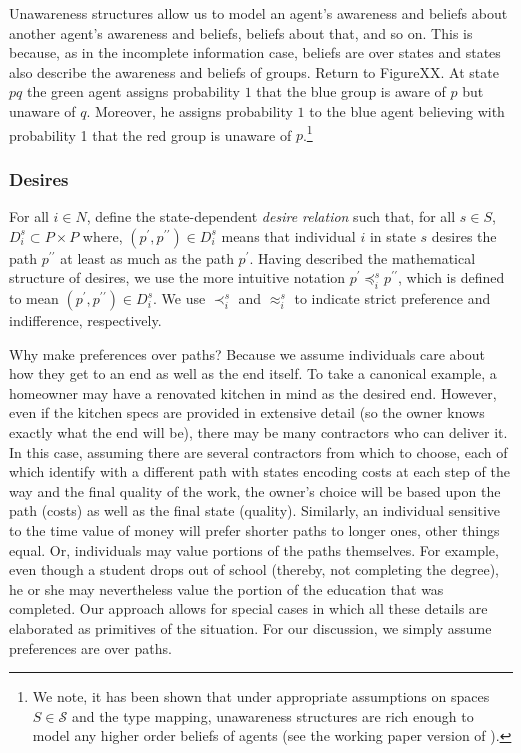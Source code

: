 \documentclass[
11pt,
titlepage,
reqno,
]{article}%
\theoremstyle{definition}
\begin{document}
Unawareness structures allow us to model an agent's awareness and beliefs about another agent's awareness and beliefs, beliefs about that, and so on. This is because, as in the incomplete information case,  beliefs are over states and states also describe the awareness and beliefs of groups.  Return to FigureXX. At state $pq$ the green agent assigns probability $1$ that the blue group is aware of $p$ but unaware of $q$. Moreover, he assigns probability $1$ to the blue agent believing with probability 1 that the red group is unaware of $p$.\footnote{We  note, it has been shown that under appropriate assumptions on spaces $S \in \mathcal{S}$ and the type mapping, unawareness structures are rich enough to model any higher order beliefs of agents (see the working paper version of \citet{Heifetz2013}).}
	
\subsubsection{Desires \label{para: desires}}
	For all $i\in N$, define the state-dependent \textit{desire relation} such that, for all $s\in S$,   $D_i^s\subset P\times P$ where, $(p^\prime,p^{\prime\prime})\in D_i^s$ means that  individual $i$ in state $s$ desires the path $p^{\prime\prime}$ at least as much as the path $p^\prime$. 
	Having described the mathematical structure of desires, we use the more intuitive notation $p^\prime\preceq_i^s p^{\prime\prime}$, which is defined to mean $(p^\prime,p^{\prime\prime})\in D_i^s$. 
	We use $\prec_i^s$ and $\approx_i^s$ to indicate strict preference and indifference, respectively. 
	
	Why make preferences over paths? Because we assume individuals care about how they get to an end as well as the end itself. 
	To take a canonical example, a homeowner may have a renovated kitchen in mind as the desired end. 
	However, even if the kitchen specs are provided in extensive detail (so the owner knows exactly what the end will be), there may be many contractors who can deliver it. 
	In this case, assuming there are several contractors from which to choose, each of which identify with a different path with states encoding costs  at each step of the way and the final quality of the work, the owner's choice will be based upon the path (costs) as well as the final state (quality). 
	Similarly, an individual sensitive to the time value of money will prefer shorter paths to longer ones, other things equal. 
	Or, individuals may value portions of the paths themselves.
	For example, even though a student drops out of school (thereby, not completing the degree), he or she may nevertheless value the portion of the education that was completed. 
	Our approach allows for special cases in which all these details are elaborated as primitives of the situation. For our discussion, we simply assume preferences are over paths.    %
	
\end{document}
